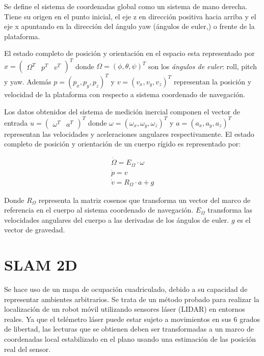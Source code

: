 \documentclass[10pt,a4paper]{article}
\begin{document}
Se define el sistema de coordenadas global como un sistema de mano derecha. Tiene su origen en el punto inicial, el eje z en dirección positiva hacia arriba y el eje x apuntando en la dirección del ángulo yaw (ángulos de euler,) o frente de la plataforma.

El estado completo de posición y orientación en el espacio esta representado por
$x =
\begin{pmatrix}
	\Omega^{T} & p^{T} & v^{T}
\end{pmatrix}^{T}$
donde $\Omega = (\phi, \theta, \psi)^{T}$ son los \emph{ángulos de euler}: roll, pitch y yaw. Además $ p = (p_{x}, p_{y}, p_{z})^{T} $ y $ v = (v_{x}, v_{y}, v_{z})^{T} $ representan la posición y velocidad de la plataforma con respecto a sistema coordenado de navegación.

Los datos obtenidos del sistema de medición inercial componen el vector de entrada 
$u = 
\begin{pmatrix}
	\omega^{T} & a^{T}
\end{pmatrix}^{T}$
donde $ \omega = (\omega_{x}, \omega_{y}, \omega_{z})^{T} $ y $ a = (a_{x}, a_{y}, a_{z})^{T}  $ representan las velocidades y aceleraciones angulares respectivamente. El estado completo de posición y orientación de un cuerpo rígido es representado por:

\begin{gather}
\label{ec:epo}
\dot{\Omega} = E_{\Omega} \cdot \omega \\
\dot{p} = v \\
\dot{v} = R_{\Omega} \cdot a + g
\end{gather}

Donde $ R_{\Omega} $ representa la matriz cosenos que transforma un vector del marco de referencia en el cuerpo al sistema coordenado de navegación. $ E_{\Omega} $ transforma las velocidades angulares del cuerpo a las derivadas de los ángulos de euler. $ g $ es el vector de gravedad.







\section{SLAM 2D}

Se hace uso de un mapa de ocupación cuadriculado, debido a su capacidad de representar ambientes arbitrarios. Se trata de un método probado para realizar la localización de un robot móvil utilizando sensores láser (LIDAR) en entornos reales. Ya que el telémetro láser puede estar sujeto a movimientos en sus 6 grados de libertad, las lecturas que se obtienen deben ser transformadas a un marco de coordenadas local estabilizado en el plano usando una estimación de las posición real del sensor.
\end{document}
